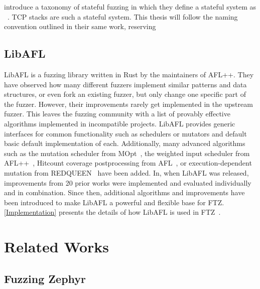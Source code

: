 \documentclass[twocolumn]{article}
\newcommand{\proj}{FTZ\xspace}
\let\savedCite=\cite
\renewcommand{\cite}{\unskip~\savedCite}
\begin{document}
\citeauthor{StatefulReview} introduce a taxonomy of stateful fuzzing in which they define a stateful system as \cite{StatefulReview}. TCP stacks are such a stateful system. This thesis will follow the naming convention outlined in their same work, reserving \cite{StatefulReview}

\subsection{LibAFL}

LibAFL is a fuzzing library written in Rust by the maintainers of AFL++. They have observed how many different fuzzers implement similar patterns and data structures, or even fork an existing fuzzer, but only change one specific part of the fuzzer. However,  their improvements rarely get implemented in the upstream fuzzer. This leaves the fuzzing community with a list of provably effective algorithms implemented in incompatible projects. LibAFL provides generic interfaces for common functionality such as schedulers or mutators and default basic default implementation of each.
Additionally, many advanced algorithms such as the mutation scheduler from MOpt\cite{MOpt}, the weighted input scheduler from AFL++\cite{AFLPlusPlus}, Hitcount coverage postprocessing from AFL\cite{AFL}, or execution-dependent mutation from REDQUEEN\cite{REDQUEEN} have been added. In, when LibAFL was released, improvements from 20 prior works were implemented and evaluated individually and in combination. Since then, additional algorithms and improvements have been introduced to make LibAFL a powerful and flexible base for \proj. \cref{Implementation} presents the details of how LibAFL is used in \proj\cite{LibAFL}.


\section{Related Works}
\label{RelatedWorks}

\subsection{Fuzzing Zephyr}
\end{document}
